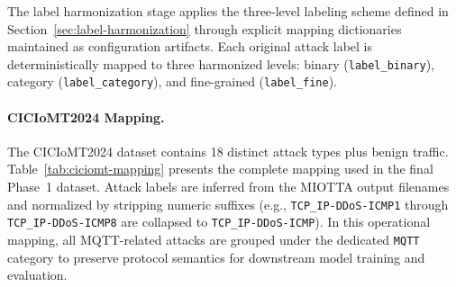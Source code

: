 The label harmonization stage applies the three-level labeling scheme defined in Section~\ref{sec:label-harmonization} through explicit mapping dictionaries maintained as configuration artifacts. Each original attack label is deterministically mapped to three harmonized levels: binary (\texttt{label\_binary}), category (\texttt{label\_category}), and fine-grained (\texttt{label\_fine}).

\paragraph{CICIoMT2024 Mapping.}
The CICIoMT2024 dataset contains 18 distinct attack types plus benign traffic. Table~\ref{tab:ciciomt-mapping} presents the complete mapping used in the final Phase~1 dataset. Attack labels are inferred from the MIOTTA output filenames and normalized by stripping numeric suffixes (e.g., \texttt{TCP\_IP-DDoS-ICMP1} through \texttt{TCP\_IP-DDoS-ICMP8} are collapsed to \texttt{TCP\_IP-DDoS-ICMP}). In this operational mapping, all MQTT-related attacks are grouped under the dedicated \texttt{MQTT} category to preserve protocol semantics for downstream model training and evaluation.


